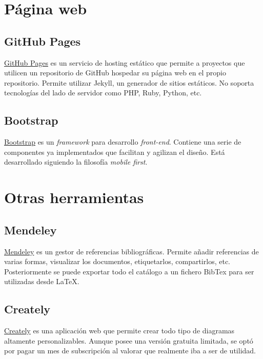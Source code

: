 \newpage
\section{Página web}\label{pagina-web}

\subsection{GitHub Pages}\label{github-pages}

\href{https://pages.github.com/}{GitHub Pages} es un servicio de hosting
estático que permite a proyectos que utilicen un repositorio de GitHub 
hospedar su página web en el propio repositorio. Permite utilizar Jekyll, un generador de sitios
estáticos. No soporta tecnologías del lado de servidor como PHP, Ruby,
Python, etc.

\subsection{Bootstrap}\label{bootstrap}

\href{http://getbootstrap.com/}{Bootstrap} es un \emph{framework} para
desarrollo \emph{front-end}. Contiene una serie de componentes ya
implementados que facilitan y agilizan el diseño. Está desarrollado
siguiendo la filosofía \emph{mobile first}.

\section{Otras herramientas}\label{otras-herramientas}

\subsection{Mendeley}\label{mendeley}

\href{https://www.mendeley.com/}{Mendeley} es un gestor de referencias
bibliográficas. Permite añadir referencias de varias formas, visualizar
los documentos, etiquetarlos, compartirlos, etc. Posteriormente se puede
exportar todo el catálogo a un fichero BibTex para ser utilizadas desde
\LaTeX.

\subsection{Creately}\label{creately}

\href{https://creately.com/}{Creately} es una aplicación web que permite
crear todo tipo de diagramas altamente personalizables. Aunque posee una
versión gratuita limitada, se optó por pagar un mes de subscripción al
valorar que realmente iba a ser de utilidad.
